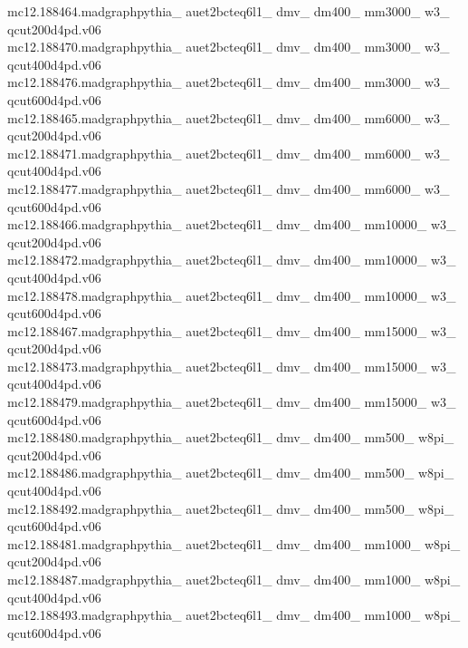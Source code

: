 mc12.188464.madgraphpythia\_ auet2bcteq6l1\_ dmv\_ dm400\_ mm3000\_ w3\_ qcut200d4pd.v06\\
mc12.188470.madgraphpythia\_ auet2bcteq6l1\_ dmv\_ dm400\_ mm3000\_ w3\_ qcut400d4pd.v06\\
mc12.188476.madgraphpythia\_ auet2bcteq6l1\_ dmv\_ dm400\_ mm3000\_ w3\_ qcut600d4pd.v06\\

mc12.188465.madgraphpythia\_ auet2bcteq6l1\_ dmv\_ dm400\_ mm6000\_ w3\_ qcut200d4pd.v06\\
mc12.188471.madgraphpythia\_ auet2bcteq6l1\_ dmv\_ dm400\_ mm6000\_ w3\_ qcut400d4pd.v06\\
mc12.188477.madgraphpythia\_ auet2bcteq6l1\_ dmv\_ dm400\_ mm6000\_ w3\_ qcut600d4pd.v06\\

mc12.188466.madgraphpythia\_ auet2bcteq6l1\_ dmv\_ dm400\_ mm10000\_ w3\_ qcut200d4pd.v06\\
mc12.188472.madgraphpythia\_ auet2bcteq6l1\_ dmv\_ dm400\_ mm10000\_ w3\_ qcut400d4pd.v06\\
mc12.188478.madgraphpythia\_ auet2bcteq6l1\_ dmv\_ dm400\_ mm10000\_ w3\_ qcut600d4pd.v06\\

mc12.188467.madgraphpythia\_ auet2bcteq6l1\_ dmv\_ dm400\_ mm15000\_ w3\_ qcut200d4pd.v06\\
mc12.188473.madgraphpythia\_ auet2bcteq6l1\_ dmv\_ dm400\_ mm15000\_ w3\_ qcut400d4pd.v06\\
mc12.188479.madgraphpythia\_ auet2bcteq6l1\_ dmv\_ dm400\_ mm15000\_ w3\_ qcut600d4pd.v06\\

mc12.188480.madgraphpythia\_ auet2bcteq6l1\_ dmv\_ dm400\_ mm500\_ w8pi\_ qcut200d4pd.v06\\
mc12.188486.madgraphpythia\_ auet2bcteq6l1\_ dmv\_ dm400\_ mm500\_ w8pi\_ qcut400d4pd.v06\\
mc12.188492.madgraphpythia\_ auet2bcteq6l1\_ dmv\_ dm400\_ mm500\_ w8pi\_ qcut600d4pd.v06\\

mc12.188481.madgraphpythia\_ auet2bcteq6l1\_ dmv\_ dm400\_ mm1000\_ w8pi\_ qcut200d4pd.v06\\
mc12.188487.madgraphpythia\_ auet2bcteq6l1\_ dmv\_ dm400\_ mm1000\_ w8pi\_ qcut400d4pd.v06\\
mc12.188493.madgraphpythia\_ auet2bcteq6l1\_ dmv\_ dm400\_ mm1000\_ w8pi\_ qcut600d4pd.v06\\

